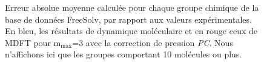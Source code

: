 \begin{figure}[ht]
  \centering
  \caption[Erreur absolue moyenne pour chaque groupe chimique de la base données FreeSolv calculée par MDFT avec la correction \textit{PC}.]{Erreur absolue moyenne calculée pour chaque groupe chimique de la base de données FreeSolv, par rapport aux valeurs expérimentales. En bleu, les résultats de dynamique moléculaire et en rouge ceux de MDFT pour $\mathrm{m}_\mathrm{max}$=3 avec la correction de pression \textit{PC}. Nous n'affichons ici que les groupes comportant 10 molécules ou plus.}
  \label{fig:AUE:mmax3}
\end{figure}



